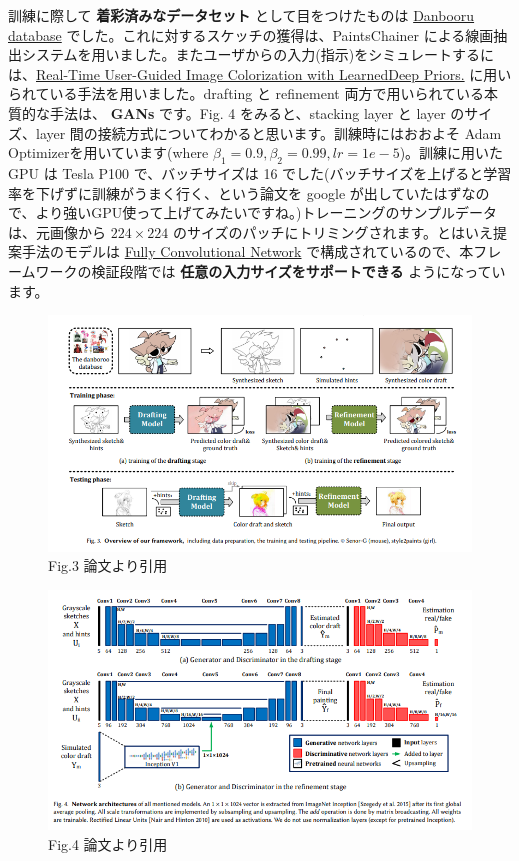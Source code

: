 \documentclass[a4paper, dvipdfmx, 10pt]{article}
\begin{document}
訓練に際して \textbf{着彩済みなデータセット} として目をつけたものは \href{https://www.gwern.net/Danbooru2018}{Danbooru database} でした。これに対するスケッチの獲得は、PaintsChainer による線画抽出システムを用いました。またユーザからの入力(指示)をシミュレートするには、\href{https://arxiv.org/pdf/1705.02999.pdf}{Real-Time User-Guided Image Colorization with LearnedDeep Priors.} に用いられている手法を用いました。drafting と refinement 両方で用いられている本質的な手法は、 \textbf{GANs} です。Fig. 4 をみると、stacking layer と layer のサイズ、layer 間の接続方式についてわかると思います。訓練時にはおおよそ Adam Optimizerを用いています(where \(\beta_1 = 0.9, \beta_2 = 0.99, lr=1e-5\))。訓練に用いた GPU は Tesla P100 で、バッチサイズは 16 でした(バッチサイズを上げると学習率を下げずに訓練がうまく行く、という論文を google が出していたはずなので、より強いGPU使って上げてみたいですね。)トレーニングのサンプルデータは、元画像から \(224 \times 224\) のサイズのパッチにトリミングされます。とはいえ提案手法のモデルは \href{https://esslab.jp/\~ess/ja/research/sketch/}{Fully Convolutional Network} で構成されているので、本フレームワークの検証段階では \textbf{任意の入力サイズをサポートできる} ようになっています。\\

\begin{figure}[htbp]
\centering
\includegraphics[width=.9\linewidth]{./img/s2p_fig3.PNG}
\caption{Fig.3 論文より引用}
\end{figure}

\begin{figure}[htbp]
\centering
\includegraphics[width=.9\linewidth]{./img/s2p_fig4.PNG}
\caption{Fig.4 論文より引用}
\end{figure}
\end{document}
